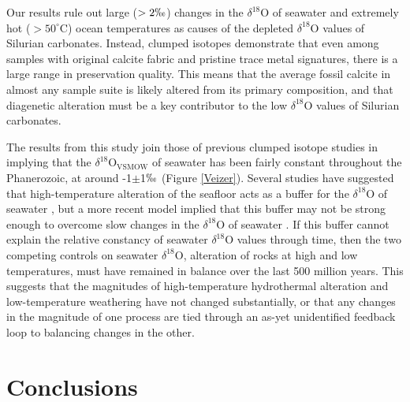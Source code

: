 \documentclass[5p, authoryear]{elsarticle}
\begin{document}
Our results rule out large ($>2\permil$) changes in the $\delta^{18}$O of seawater and extremely hot ($>50^{\circ}$C) ocean temperatures as causes of the depleted $\delta^{18}$O values of Silurian carbonates. Instead, clumped isotopes demonstrate that even among samples with original calcite fabric and pristine trace metal signatures, there is a large range in preservation quality. This means that the average fossil calcite in almost any sample suite is likely altered from its primary composition, and that diagenetic alteration must be a key contributor to the low $\delta^{18}$O values of Silurian carbonates. 

The results from this study join those of previous clumped isotope studies \citep{Came2007, Dennis2013, Finnegan2011} in implying that the $\delta^{18}$O$_{\text{VSMOW}}$ of seawater has been fairly constant throughout the Phanerozoic, at around -1$\pm$1$\permil$ (Figure \ref{Veizer}). Several studies have suggested that high-temperature alteration of the seafloor acts as a buffer for the $\delta^{18}$O of seawater \citep{Muehlenbachs1976, Gregory1981, Gregory1991, Muehlenbachs1998}, but a more recent model implied that this buffer may not be strong enough to overcome slow changes in the $\delta^{18}$O of seawater \citep{Jaffres2007}. If this buffer cannot explain the relative constancy of seawater $\delta^{18}$O values through time, then the two competing controls on seawater $\delta^{18}$O, alteration of rocks at high and low temperatures, must have remained in balance over the last 500 million years. This suggests that the magnitudes of high-temperature hydrothermal alteration and low-temperature weathering have not changed substantially, or that any changes in the magnitude of one process are tied through an as-yet unidentified feedback loop to balancing changes in the other. 

\section{Conclusions}
\end{document}
